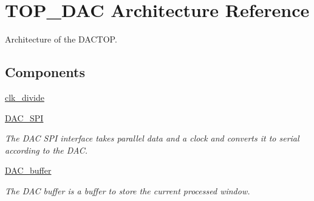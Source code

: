 \hypertarget{classdac__Top_1_1TOP__DAC}{\section{T\-O\-P\-\_\-\-D\-A\-C Architecture Reference}
\label{classdac__Top_1_1TOP__DAC}
}


Architecture of the D\-A\-C\-T\-O\-P.  


\subsection*{Components}
 \begin{DoxyCompactItemize}
\item 
\hyperlink{classdac__Top_1_1TOP__DAC_a904d954c80fa4089ba9eeeb9497214f2}{clk\-\_\-divide}  {\bfseries }  
\item 
\hypertarget{classdac__Top_1_1TOP__DAC_affa2663bbacf97f6ebd5b4e226f94f9f}{\hyperlink{classdac__Top_1_1TOP__DAC_affa2663bbacf97f6ebd5b4e226f94f9f}{D\-A\-C\-\_\-\-S\-P\-I}  {\bfseries }  }\label{classdac__Top_1_1TOP__DAC_affa2663bbacf97f6ebd5b4e226f94f9f}

\begin{DoxyCompactList}\small\item\em The D\-A\-C S\-P\-I interface takes parallel data and a clock and converts it to serial according to the D\-A\-C. \end{DoxyCompactList}\item 
\hypertarget{classdac__Top_1_1TOP__DAC_aee2b4aec5b20245f5b186d9084b7570a}{\hyperlink{classdac__Top_1_1TOP__DAC_aee2b4aec5b20245f5b186d9084b7570a}{D\-A\-C\-\_\-buffer}  {\bfseries }  }\label{classdac__Top_1_1TOP__DAC_aee2b4aec5b20245f5b186d9084b7570a}

\begin{DoxyCompactList}\small\item\em The D\-A\-C buffer is a buffer to store the current processed window. \end{DoxyCompactList}\end{DoxyCompactItemize}
